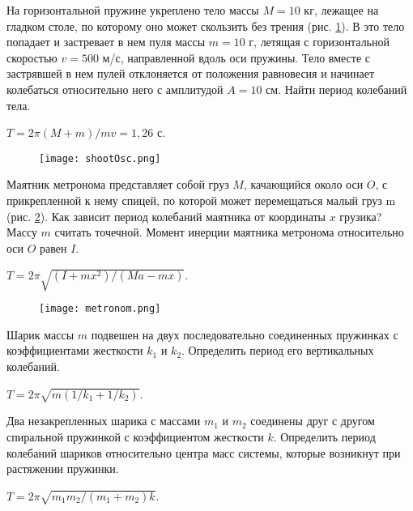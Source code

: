 \begin{ex} %
На горизонтальной пружине укреплено тело массы $M = 10$ кг, лежащее на гладком столе, по которому оно может скользить без трения (рис. \ref{shootOsc}). В это тело попадает и застревает в нем пуля массы $m = 10$ г, летящая с горизонтальной скоростью $v = 500$ м/с, направленной вдоль оси пружины. Тело вместе с застрявшей в нем пулей отклоняется от положения равновесия и начинает колебаться относительно него с амплитудой $A = 10$ см. Найти период колебаний тела.
\begin{ans}
$T = 2 \pi (M+m) / mv = 1,26$ с.
\end{ans}
\end{ex}	

\begin{figure}[h]
\centering
\texttt{[image: shootOsc.png]}
\caption{}
\label{shootOsc}
\end{figure}

\begin{ex} %
Маятник метронома представляет собой груз $M$, качающийся около оси $O$, с прикрепленной к нему спицей, по которой может перемещаться малый груз m (рис. \ref{metronom}). Как зависит период колебаний маятника от координаты $x$ грузика? Массу $m$ считать точечной. Момент инерции маятника метронома относительно оси $O$ равен $I$.
\begin{ans}
$T = 2 \pi \sqrt{(I+mx^2)/(Ma - mx)}$.
\end{ans}
\end{ex}	

\begin{figure}[h]
\centering
\texttt{[image: metronom.png]}
\caption{}
\label{metronom}
\end{figure}

\begin{ex} %
Шарик массы $m$ подвешен на двух последовательно соединенных пружинках с коэффициентами жесткости $k_1$ и $k_2$. Определить период его вертикальных колебаний.
\begin{ans}
$T = 2 \pi \sqrt{m(1/k_1 + 1/k_2)}$.
\end{ans}
\end{ex}	

\begin{ex} %
Два незакрепленных шарика с массами $m_1$ и $m_2$ соединены друг с другом спиральной пружинкой с коэффициентом жесткости $k$. Определить период колебаний шариков относительно центра масс системы, которые возникнут при растяжении пружинки.
\begin{ans}
$T = 2 \pi \sqrt{m_1m_2/(m_1 + m_2)k}$.
\end{ans}
\end{ex}	

